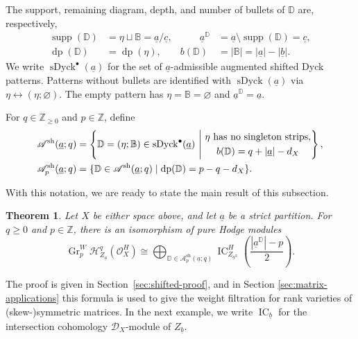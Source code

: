 \documentclass[12pt]{amsart}
\renewcommand{\a}{\underline{a}}
\renewcommand{\b}{\underline{b}}
\newcommand{\DD}{\mathbb{D}}
\newcommand{\defi}[1]{{\upshape\sffamily #1}}
\newtheorem{thmx}{Theorem}
\theoremstyle{definition}
\numberwithin{equation}{section}
\begin{document}
The \defi{support}, \defi{remaining diagram}, \defi{depth}, and
\defi{number of bullets} of $\DD$ are, respectively,
\begin{align}
 \operatorname{supp}(\DD)&=\eta\sqcup\mathbb B=\a/\underline c,
 &\qquad \a^{\DD}&=\a\setminus\operatorname{supp}(\DD)=\underline c,
 \label{eq:sh-augmented-support}\\
 \operatorname{dp}(\DD)&=\operatorname{dp}(\eta),
 & b(\DD)&=|\mathbb B|=|\a|-|\b|.
 \label{eq:sh-augmented-statistics}
\end{align}
We write $\operatorname{sDyck}^{\bullet}(\a)$ for the set of
$\a$-admissible augmented shifted Dyck patterns. Patterns without
bullets are identified with $\operatorname{sDyck}(\a)$ via
$\eta\leftrightarrow(\eta;\varnothing)$. The empty pattern has
$\eta=\mathbb B=\varnothing$ and $\a^{\DD}=\a$.



For $q\in\mathbb Z_{\geq0}$ and $p\in\mathbb Z$, define
\begin{align}
 \mathscr A^{\mathrm{sh}}(\a;q)
 &=\left\{\DD=(\eta;\mathbb B)\in
       \operatorname{sDyck}^{\bullet}(\a)\ \middle|\
       \begin{gathered}
        \eta\textnormal{ has no singleton strips},\\
        b(\DD)=q+|\a|-d_X
       \end{gathered}\right\},\label{eq:sh-lc-patterns}\\
 \mathscr A^{\mathrm{sh}}_p(\a;q)
 &=\{\DD\in\mathscr A^{\mathrm{sh}}(\a;q)\mid
                  \operatorname{dp}(\DD)=p-q-d_X\}.
 \label{eq:sh-weight-patterns}
\end{align}

\noindent With this notation, we are ready to state the main result of this subsection.

\begin{thmx}\label{thm:sh-local-cohomology}
Let $X$ be either space above, and let $\a$ be a strict partition. For $q\geq0$
and $p\in\mathbb Z$, there is an isomorphism of pure
Hodge modules
\begin{equation}\label{eq:sh-weight-formula}
 \operatorname{Gr}^W_p\mathscr H^q_{Z_{\a}}(\mathscr O_X^H)
 \cong
 \bigoplus_{\DD\in\mathscr A^{\mathrm{sh}}_p(\a;q)}
 \operatorname{IC}_{Z_{\a^{\DD}}}^H
       \left(\frac{|\a^{\DD}|-p}{2}\right).
\end{equation}
\end{thmx}

 The proof is given in Section~\ref{sec:shifted-proof}, and in Section \ref{sec:matrix-applications} this formula is used to give the weight filtration for rank varieties of (skew-)symmetric matrices. In the next example, we write $\operatorname{IC}_{\b}$ for the intersection cohomology $\mathscr D_X$-module of $Z_{\b}$.
\end{document}

